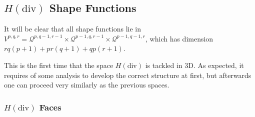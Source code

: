 \subsection{\texorpdfstring{$H(\mathrm{div})$}{Hdiv} Shape Functions}

It will be clear that all shape functions lie in $V^{p,q,r}=\mathcal{Q}^{p,q-1,r-1}\times\mathcal{Q}^{p-1,q,r-1}\times \mathcal{Q}^{p-1,q-1,r}$, which has dimension $rq(p+1)+pr(q+1)+qp(r+1)$.

This is the first time that the space $H(\mathrm{div})$ is tackled in 3D.
As expected, it requires of some analysis to develop the correct structure at first, but afterwards one can proceed very similarly as the previous spaces.

\subsubsection{\texorpdfstring{$H(\mathrm{div})$}{Hdiv} Faces}


